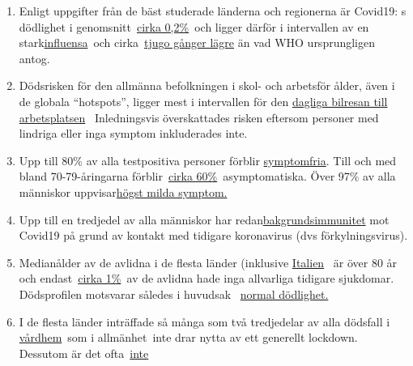\begin{enumerate}
\def\labelenumi{\arabic{enumi}.}
\tightlist
\item
  Enligt uppgifter från de bäst studerade länderna och regionerna är
  Covid19: s dödlighet i
  genomsnitt~\href{https://swprs.org/studies-on-covid-19-lethality/}{cirka
  0,2\%}~och ligger därför i intervallen av en
  stark\href{https://www.ebm-netzwerk.de/en/publications/covid-19}{influensa}~och
  cirka~\href{https://www.businessinsider.com/coronavirus-death-rate-by-age-countries-2020-3}{tjugo
  gånger lägre} än vad WHO ursprungligen antog.
\item
  Dödsrisken för den allmänna befolkningen i skol- och arbetsför ålder,
  även i de globala ``hotspots'', ligger mest i intervallen för den
  \href{https://www.medrxiv.org/content/10.1101/2020.04.05.20054361v1}{dagliga
  bilresan till arbetsplatsen}~ Inledningsvis överskattades risken
  eftersom personer med lindriga eller inga symptom inkluderades inte.
\item
  Upp till 80\% av alla testpositiva personer förblir
  \href{https://www.bmj.com/content/369/bmj.m1375}{symptomfria}. Till
  och med bland 70-79-åringarna
  förblir~\href{https://www.niid.go.jp/niid/en/2019-ncov-e/9407-covid-dp-fe-01.html}{cirka
  60\%}~asymptomatiska. Över 97\% av alla människor
  uppvisar\href{https://swprs.org/studies-on-covid-19-lethality/\#hospitalizations}{högst
  milda symptom.}
\item
  Upp till en tredjedel av alla människor har
  redan\href{https://www.cell.com/cell/fulltext/S0092-8674(20)30610-3}{bakgrundsimmunitet}
  mot Covid19 på grund av kontakt med tidigare koronavirus (dvs
  förkylningsvirus).
\item
  Medianålder av de avlidna i de flesta länder (inklusive
  \href{https://www.epicentro.iss.it/coronavirus/sars-cov-2-decessi-italia}{Italien}~
  är över 80 år och
  endast~\href{https://www.bloomberg.com/news/articles/2020-03-18/99-of-those-who-died-from-virus-had-other-illness-italy-says}{cirka
  1\%}~av de avlidna hade inga allvarliga tidigare sjukdomar.
  Dödsprofilen motsvarar således i huvudsak
  ~\href{https://www.vienna.at/analyse-zeigt-covid-19-opferkurve-entspricht-normaler-mortalitaet/6581246}{normal
  dödlighet.}
\item
  I de flesta länder inträffade så många som två tredjedelar av alla
  dödsfall i
  \href{https://swprs.org/studies-on-covid-19-lethality/\#care-homes}{vårdhem}~som
  i allmänhet~inte drar nytta av ett generellt lockdown. Dessutom är det
  ofta~\href{https://www.hsj.co.uk/commissioning/thousands-of-extra-deaths-outside-hospital-not-attributed-to-covid-19/7027459.article}{inte
}
\end{enumerate}
